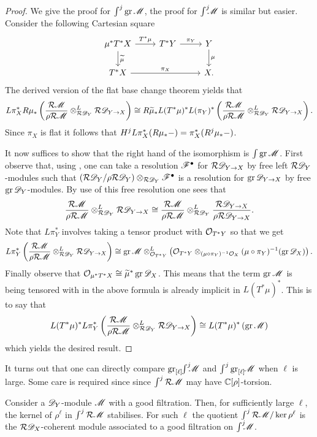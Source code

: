 \begin{proof}
  We give the proof for $\int^j \operatorname{gr} \mathscr{M}$, the proof for $\int^j \mkern -8mu \mathscr{M}$ is similar but easier.
  Consider the following Cartesian square
  $$
      \begin{tikzcd}
        \mu^*T^* X \arrow{r}{T^*\mu} \arrow{d}{{\widetilde{\mu}}} &T^*Y \arrow{r}{\pi_Y} & Y\arrow{d}{\mu} \\
        T^*X\arrow{rr}{\pi_X}  && X.
      \end{tikzcd}
  $$
  The derived version of the flat base change theorem \cite[Chapter 4, Proposition 3.1.0]{berthelot2006theorie}  yields that
  $$L\pi_X^*R\mu_*\left(\frac{\mathcal{R}\mathscr{M}}{\rho\mathcal{R} \mathscr{M}}\otimes^L_{\mathcal{R}\mathscr{D}_Y}\mathcal{R} \mathscr{D}_{Y\to X}\right)\cong  R\widetilde{\mu}_*L(T^*\mu)^*L(\pi_Y)^*\left(\frac{\mathcal{R}\mathscr{M}}{\rho\mathcal{R} \mathscr{M}}\otimes^L_{\mathcal{R}\mathscr{D}_Y}\mathcal{R} \mathscr{D}_{Y\to X}\right).$$
  Since $\pi_X$ is flat it follows that $H^j L\pi_X^*(R\mu_* {-}) = \pi_X^*(R^j\mu_*{-})$.

  It now suffices to show that the right hand of the isomorphism is $\int \operatorname{gr}\mathscr{M}$.
  First observe that, using , one can take a resolution $\mathscr{F}^\bullet$ for $\mathcal{R} \mathscr{D}_{Y\to X}$ by free left $\mathcal{R}\mathscr{D}_Y$-modules such that $ (\mathcal{R} \mathscr{D}_{Y} / \rho\mathcal{R} \mathscr{D}_{Y})\otimes_{\mathcal{R} \mathscr{D}_Y}\mathscr{F}^\bullet$ is a resolution for $\operatorname{gr} \mathscr{D}_{Y\to X}$ by free $\operatorname{gr}\mathscr{D}_Y$-modules.
  By use of this free resolution one sees that
  $$ \frac{\mathcal{R}\mathscr{M}}{\rho\mathcal{R} \mathscr{M}}\otimes^L_{\mathcal{R}\mathscr{D}_Y}\mathcal{R} \mathscr{D}_{Y\to X} \cong \frac{\mathcal{R}\mathscr{M}}{\rho\mathcal{R} \mathscr{M}} \otimes^L_{\mathcal{R}\mathscr{D}_Y}\frac{\mathcal{R} \mathscr{D}_{Y\to X}}{\rho\mathcal{R} \mathscr{D}_{Y\to X}}.$$
  Note that $L\pi_Y^*$ involves taking a tensor product with $\mathcal{O}_{T^*Y}$ so that we get
  $$L\pi_Y^*\left( \frac{\mathcal{R}\mathscr{M}}{\rho\mathcal{R} \mathscr{M}}\otimes^L_{\mathcal{R}\mathscr{D}_Y} \mathcal{R} \mathscr{D}_{Y\to X}\right) \cong \operatorname{gr}\mathscr{M} \otimes_{\mathcal{O}_{T^*Y}}^L \left( \mathcal{O}_{T^*Y}\otimes_{(\mu\circ \pi_Y)^{-1}\mathcal{O}_X}(\mu\circ\pi_Y)^{-1}(\operatorname{gr}\mathscr{D}_X)\right).$$
  Finally observe that $\mathcal{O}_{\mu^*T^*X} \cong \widetilde{\mu}^*\operatorname{gr}\mathscr{D}_X$.
  This means that the term $\operatorname{gr}\mathscr{M}$ is being tensored with in the above formula is already implicit in $L(T^*\mu)^*$.
  This is to say that
  $$L(T^*\mu)^*L\pi_Y^*\left( \frac{\mathcal{R}\mathscr{M}}{\rho\mathcal{R} \mathscr{M}}\otimes^L_{\mathcal{R}\mathscr{D}_Y} \mathcal{R} \mathscr{D}_{Y\to X}\right) \cong L(T^*\mu)^*\left(\operatorname{gr}\mathscr{M}\right)$$
  which yields the desired result.
\end{proof}
It turns out that one can directly compare $\operatorname{gr}_{[\ell]}\mkern-5mu\int^j \mkern -8mu\mathscr{M}$ and $\int^j \operatorname{gr}_{[\ell]}\mkern-5mu\mathscr{M}$ when $\ell$ is large.
Some care is required since since $\int^j \mathcal{R} \mathscr{M}$ may have $\mathbb{C}[\rho]$-torsion.
\begin{lemma}\label{lem: KernelZellStabilises}
  Consider a $\mathscr{D}_Y$-module $\mathscr{M}$ with a good filtration.
  Then, for sufficiently large $\ell$, the kernel of $\rho^\ell$ in $\int^j \mathcal{R} \mathscr{M}$ stabilises.
  For such $\ell$ the quotient $\int^j \mathcal{R} \mathscr{M}/ \ker \rho^\ell$ is the $\mathcal{R} \mathscr{D}_X$-coherent module associated to a good filtration on $\int^j \mkern -8mu \mathscr{M}$.
\end{lemma}
